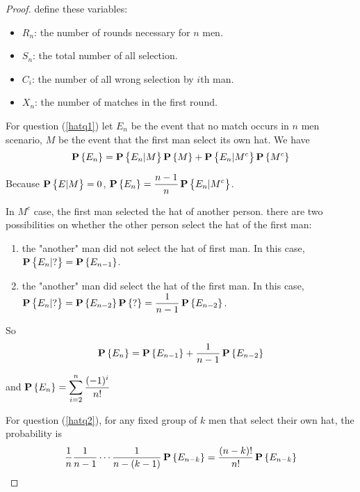 \begin{proof}
    define these variables:
    \begin{itemize}
        \item $R_n$: the number of rounds necessary for $n$ men.
        \item $S_n$: the total number of all selection.
        \item $C_i$: the number of all wrong selection by $i$th man.
        \item $X_n$: the number of matches in the first round.
    \end{itemize}
    
    For question (\ref{hatq1}) let $E_n$ be the event that no match occurs in $n$ men scenario, $M$ be the event that the first man select its own hat. We have
    \begin{equation*}
        \mathop{\bf P\/}\displaystyle \left\{E_n\right\} = \mathop{\bf P\/}\displaystyle \left\{E_n|M\right\} \mathop{\bf P\/}\displaystyle \left\{M\right\} + \mathop{\bf P\/}\displaystyle \left\{E_n|M^c\right\} \mathop{\bf P\/}\displaystyle \left\{M^c\right\}
    \end{equation*}

    Because $\mathop{\bf P\/}\displaystyle \left\{E|M\right\} = 0$, $\displaystyle \mathop{\bf P\/}\displaystyle \left\{E_n\right\} = \frac{n-1}{n} \mathop{\bf P\/}\displaystyle \left\{E_n|M^c\right\} $.
    
    In $M^c$ case, the first man selected the hat of another person. there are two possibilities on whether the other person select the hat of the first man:
    \begin{enumerate}
        \item the "another" man did not select the hat of first man. In this case, $\mathop{\bf P\/}\displaystyle \left\{E_{n}|?\right\} = \mathop{\bf P\/}\displaystyle \left\{E_{n-1}\right\}$.
        \item the "another" man did select the hat of the first man. In this case, $\mathop{\bf P\/}\displaystyle \left\{E_{n}|?\right\} = \mathop{\bf P\/}\displaystyle \left\{E_{n-2}\right\} \mathop{\bf P\/}\displaystyle \left\{?\right\} = \displaystyle \frac{1}{n-1} \mathop{\bf P\/}\displaystyle \left\{E_{n-2}\right\}$.
    \end{enumerate}
    
    So 
    \begin{equation*}
        \mathop{\bf P\/}\displaystyle \left\{E_n\right\} = \mathop{\bf P\/}\displaystyle \left\{E_{n-1}\right\} + \frac{1}{n-1} \mathop{\bf P\/}\displaystyle \left\{E_{n-2}\right\}
    \end{equation*}
    
    and $\mathop{\bf P\/}\displaystyle \left\{E_n\right\} = \displaystyle \sum_{i=2}^n \frac{(-1)^i}{n!}$
    
    
    For question (\ref{hatq2}), for any fixed group of $k$ men that select their own hat, the probability is 
    \begin{equation*}
        \frac{1}{n} \frac{1}{n-1} \cdots \frac{1}{n-(k-1)} \mathop{\bf P\/}\displaystyle \left\{E_{n-k}\right\} = \frac{(n-k)!}{n!} \mathop{\bf P\/}\displaystyle \left\{E_{n-k}\right\}
    \end{equation*}
    

\end{proof}
